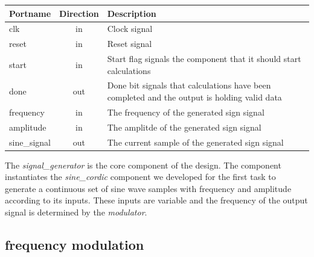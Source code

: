 \begin{adjustwidth}{-3.3cm}{}
	\begin{center}
		\begin{tabular}{ | l | c | l | }
			\hline
			\textbf{Portname} & \textbf{Direction} & \textbf{Description} \\
			\hline
			clk & in & Clock signal \\
			reset & in  & Reset signal \\
			start & in  & Start flag signals the component that it should start calculations \\
			done & out  & Done bit signals that calculations have been completed and the output is holding valid data \\
			frequency & in  & The frequency of the generated sign signal \\
			amplitude & in  & The amplitde of the generated sign signal \\
			sine\_signal & out  & The current sample of the generated sign signal \\
			\hline
		\end{tabular} 
	\end{center}
\end{adjustwidth}

\vspace{4mm}

The \textit{signal\_generator} is the core component of the design. The component instantiates the \textit{sine\_cordic} component we developed for the first task to generate a continuous set of sine wave samples with frequency and amplitude according to its inputs. These inputs are variable and the frequency of the output signal is determined by the \textit{modulator}.


\subsection{frequency modulation}


